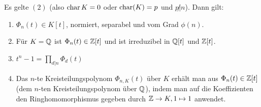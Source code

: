 \documentclass[12pt,a4paper]{scrartcl}
\begin{document}
\begin{satz}\label{thm:24.6}
	Es gelte $(2)$ (also $\operatorname{char} K = 0$ oder $\operatorname{char}(K) = p$ und $p\not|n$). Dann gilt:
	\begin{enumerate}
		\item $\Phi_n(t)\in K[t]$, normiert, separabel und vom Grad $\phi(n)$.
		\item Für $K = \mathbb Q$ ist $\Phi_n(t)\in\mathbb Z[t]$ und ist irreduzibel in $\mathbb Q[t]$ und $\mathbb Z[t]$.
		\item $t^n-1 = \prod_{d|n}\Phi_d(t)$
		\item Das $n$-te Kreisteilungspolynom $\Phi_{n,K}(t)$ über $K$ erhält man aus $\Phi_n(t)\in\mathbb Z[t]$ (dem $n$-ten Kreisteilungspolynom über $\mathbb Q$), indem man auf die Koeffizienten den Ringhomomorphismus gegeben durch $\mathbb Z\to K, 1\mapsto 1$ anwendet.
	\end{enumerate}
\end{satz}
\end{document}
